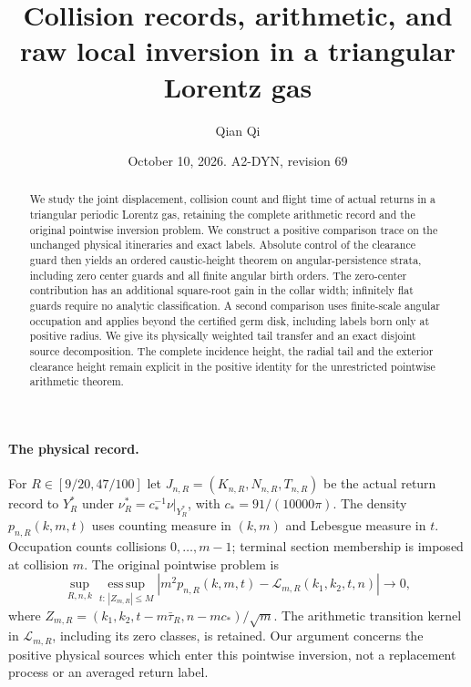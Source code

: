 \documentclass[11pt,reqno]{amsart}
\title[Collision records and raw local inversion]{Collision records, arithmetic, and raw local inversion in a triangular Lorentz gas}
\author{Qian Qi}
\date{October 10, 2026. A2-DYN, revision 69}
\numberwithin{equation}{section}
\theoremstyle{definition}\newtheorem{definition}[theorem]{Definition}
\theoremstyle{remark}\newtheorem{remark}[theorem]{Remark}
\begin{document}
\raggedbottom
\begin{abstract}
We study the joint displacement, collision count and flight time of
actual returns in a triangular periodic Lorentz gas, retaining the
complete arithmetic record and the original pointwise inversion
problem. We construct a positive comparison trace on the unchanged
physical itineraries and exact labels. Absolute control of the
clearance guard then yields an ordered caustic-height theorem on
angular-persistence strata, including zero center guards and all
finite angular birth orders. The zero-center contribution has an
additional square-root gain in the collar width; infinitely flat
guards require no analytic classification. A second comparison uses
finite-scale angular occupation and applies beyond the certified
germ disk, including labels born only at positive radius. We give
its physically weighted tail transfer and an exact disjoint
source decomposition. The complete incidence height, the radial
tail and the exterior clearance height remain explicit in the
positive identity for the unrestricted pointwise arithmetic theorem.
\end{abstract}
\maketitle

\paragraph{The physical record.}
For $R\in[9/20,47/100]$ let
$J_{n,R}=(K_{n,R},N_{n,R},T_{n,R})$ be the actual return record
to $Y_R^*$ under $\nu_R^*=c_*^{-1}\nu|_{Y_R^*}$, with
$c_*=91/(10000\pi)$. The density $p_{n,R}(k,m,t)$ uses counting
measure in $(k,m)$ and Lebesgue measure in $t$. Occupation counts
collisions $0,\ldots,m-1$; terminal section membership is imposed
at collision $m$. The original pointwise problem is
\begin{equation}\label{eq:intro-v69-pointwise-target}
 \sup_{R,n,k}\operatorname*{ess\,sup}_{t:\,|Z_{m,R}|\le M}
 \left|m^2p_{n,R}(k,m,t)-\mathcal L_{m,R}(k_1,k_2,t,n)\right|
                                      \longrightarrow0,
\end{equation}
where $Z_{m,R}=(k_1,k_2,t-m\bar\tau_R,n-mc_*)/\sqrt m$.
The arithmetic transition kernel in $\mathcal L_{m,R}$, including
its zero classes, is retained. Our argument concerns the positive
physical sources which enter this pointwise inversion, not a
replacement process or an averaged return label.
\end{document}

